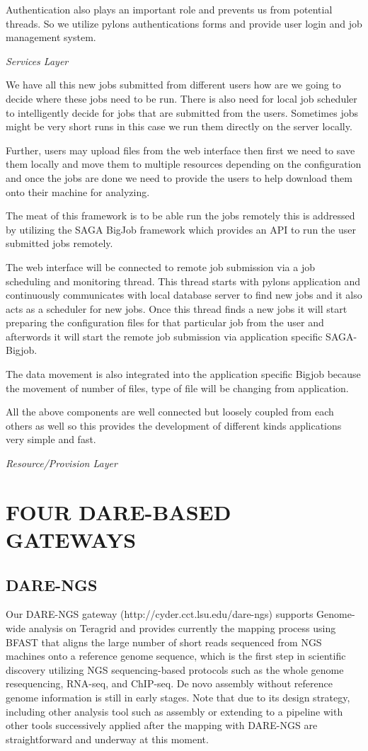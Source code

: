 \documentclass{sig-alternate}
\begin{document}
Authentication also plays an important role and prevents us from potential threads. So we utilize pylons authentications forms and provide user login and job management system.

\textit{Services Layer}

We have all this new jobs submitted from different users how are we going to decide where these jobs need to be run. There is also need for local job scheduler to intelligently decide for jobs that are submitted from the users. Sometimes jobs might be very short runs in this case we run them directly on the server locally.

Further, users may upload files from the web interface then first we need to save them locally and move them to multiple resources depending on the configuration and once the jobs are done we need to provide the users to help download them onto their machine for analyzing.

The meat of this framework is to be able run the jobs remotely this is addressed by utilizing the SAGA BigJob framework which provides an API to run the user submitted jobs remotely.


The web interface will be connected to remote job submission via a job scheduling and monitoring thread. This thread starts with pylons application and continuously communicates with local database server to find new jobs and it also acts as a scheduler for new jobs. Once this thread finds a new jobs it will start preparing the configuration files for that particular job from the user and afterwords it will start the remote job submission via application specific SAGA-Bigjob.

The data movement is also integrated into the application specific Bigjob because the movement of number of files, type of file will be changing from application.


All the above components are well connected but loosely coupled from each others as well so this provides the development of different kinds applications very simple and fast.

\textit{Resource/Provision Layer}


\section{FOUR DARE-BASED GATEWAYS}
\subsection{DARE-NGS}
Our DARE-NGS gateway (http://cyder.cct.lsu.edu/dare-ngs) supports Genome-wide analysis on Teragrid and provides currently the mapping process using BFAST that aligns the large number of short reads sequenced from NGS machines onto a reference genome sequence, which is the first step in scientific discovery utilizing NGS sequencing-based protocols such as the whole genome resequencing, RNA-seq, and ChIP-seq.  De novo assembly without reference genome information is still in early stages.  Note that due to its design strategy, including other analysis tool such as assembly or extending to a pipeline with other tools successively applied after the mapping with DARE-NGS are straightforward and underway at this moment.
\end{document}
